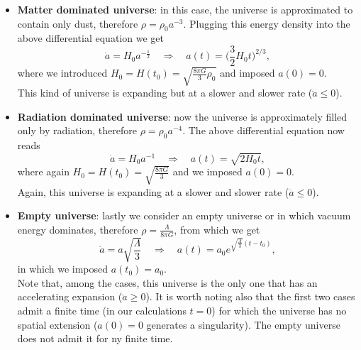 \begin{itemize}
    \item \textbf{Matter dominated universe}: in this case, the universe is approximated to contain only dust, therefore $\rho=\rho_0a^{-3}$. Plugging this energy density into the above differential equation we get$$\dot a=H_0a^{-\frac{1}{2}}\quad \Rightarrow\quad a(t)=\bigg(\frac{3}{2}H_0t\bigg)^{2/3},$$ where we introduced $H_0=H(t_0)=\sqrt{\frac{8\pi G}{3}\rho_0}$ and imposed $a(0)=0$.\\ This kind of universe is expanding but at a slower and slower rate ($\ddot a\leq0$).
    \item  \textbf{Radiation dominated universe}: now the universe is approximately filled only by radiation, therefore $\rho=\rho_0a^{-4}$. The above differential equation now reads$$\dot a=H_0a^{-1}\quad \Rightarrow\quad a(t)=\sqrt{2H_0t},$$ where again $H_0=H(t_0)=\sqrt{\frac{8\pi G}{3}}$ and we imposed $a(0)=0$.\\ Again, this universe is expanding at a slower and slower rate ($\ddot a\leq0$).
    \item \textbf{Empty universe}: lastly we consider an empty universe or in which vacuum energy dominates, therefore $\rho=\frac{\Lambda}{8\pi G}$, from which we get$$\dot a=a\sqrt{\frac{\Lambda}{3}}\quad \Rightarrow\quad a(t)=a_0e^{\sqrt{\frac{\Lambda}{3}}(t-t_0)},$$
     in which we imposed $a(t_0)=a_0$.\\Note that, among the cases, this universe is the only one that has an accelerating expansion ($\ddot a\geq0$). It is worth noting also that the first two cases admit a finite time (in our calculations $t=0$) for which the universe has no spatial extension ($a(0)=0$ generates a singularity). The empty universe does not admit it for ny finite time. 
\end{itemize}
